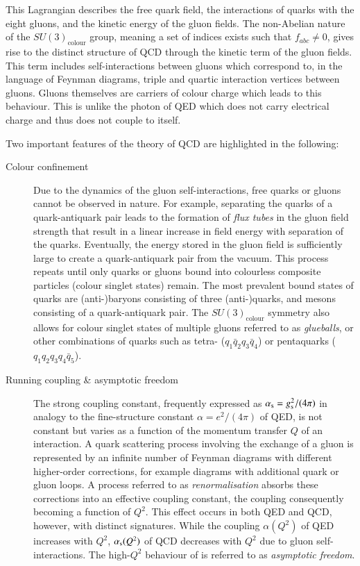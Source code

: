 This Lagrangian describes the free quark field, the interactions of quarks with
the eight gluons, and the kinetic energy of the gluon fields. The non-Abelian
nature of the $SU(3)_{\text{colour}}$ group, meaning a set of indices exists
such that $f_{abc} \neq 0$, gives rise to the distinct structure of QCD through
the kinetic term of the gluon fields. This term includes self-interactions
between gluons which correspond to, in the language of Feynman diagrams, triple
and quartic interaction vertices between gluons. Gluons themselves are carriers
of colour charge which leads to this behaviour. This is unlike the photon of QED
which does not carry electrical charge and thus does not couple to itself.

Two important features of the theory of QCD are highlighted in the following:
\begin{description}

\item[Colour confinement] Due to the dynamics of the gluon self-interactions,
  free quarks or gluons cannot be observed in nature. For example, separating
  the quarks of a quark-antiquark pair leads to the formation of \emph{flux
    tubes} in the gluon field strength that result in a linear increase in field
  energy with separation of the quarks. Eventually, the energy stored in the
  gluon field is sufficiently large to create a quark-antiquark pair from the
  vacuum. This process repeats until only quarks or gluons bound into colourless
  composite particles (colour singlet states) remain. The most prevalent bound
  states of quarks are (anti-)baryons consisting of three (anti-)quarks, and
  mesons consisting of a quark-antiquark pair. The $SU(3)_{\text{colour}}$
  symmetry also allows for colour singlet states of multiple gluons referred to
  as \emph{glueballs}, or other combinations of quarks such as tetra-
  ($q_1 \bar{q}_2 q_3 \bar{q}_4$) or pentaquarks ($q_1 q_2 q_3 q_4 \bar{q}_5$).

\item[Running coupling \& asymptotic freedom] The strong coupling constant,
  frequently expressed as $\alpha_{\text{s}} = g_{\text{s}}^2 / (4 \pi)$ in analogy to the
  fine-structure constant $\alpha = e^2 / (4 \pi)$ of QED, is not constant but
  varies as a function of the momentum transfer $Q$ of an interaction. A quark
  scattering process involving the exchange of a gluon is represented by an
  infinite number of Feynman diagrams with different higher-order corrections,
  for example diagrams with additional quark or gluon loops. A process referred
  to as \emph{renormalisation} absorbs these corrections into an effective
  coupling constant, the coupling consequently becoming a function of
  $Q^2$. This effect occurs in both QED and QCD, however, with distinct
  signatures. While the coupling $\alpha(Q^2)$ of QED increases with $Q^2$,
  $\alpha_{\text{s}}(Q^2)$ of QCD decreases with $Q^2$ due to gluon self-interactions. The
  high-$Q^2$ behaviour of \alphas is referred to as \emph{asymptotic freedom}.
\end{description}


